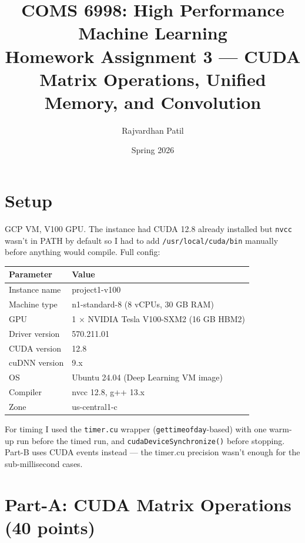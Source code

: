 \documentclass[11pt,letterpaper]{article}
\title{\textbf{COMS 6998: High Performance Machine Learning}\\
       Homework Assignment 3 --- CUDA Matrix Operations, Unified Memory, and Convolution}
\author{Rajvardhan Patil}
\date{Spring 2026}
\begin{document}
\maketitle
\tableofcontents
\newpage

\section{Setup}

GCP VM, V100 GPU. The instance had CUDA 12.8 already installed but \texttt{nvcc}
wasn't in PATH by default so I had to add \texttt{/usr/local/cuda/bin} manually
before anything would compile. Full config:

\begin{center}
\begin{tabular}{ll}
\toprule
\textbf{Parameter} & \textbf{Value} \\
\midrule
Instance name   & project1-v100 \\
Machine type    & n1-standard-8 (8 vCPUs, 30 GB RAM) \\
GPU             & 1 $\times$ NVIDIA Tesla V100-SXM2 (16 GB HBM2) \\
Driver version  & 570.211.01 \\
CUDA version    & 12.8 \\
cuDNN version   & 9.x \\
OS              & Ubuntu 24.04 (Deep Learning VM image) \\
Compiler        & nvcc 12.8, g++ 13.x \\
Zone            & us-central1-c \\
\bottomrule
\end{tabular}
\end{center}

For timing I used the \texttt{timer.cu} wrapper (\texttt{gettimeofday}-based) with
one warm-up run before the timed run, and \texttt{cudaDeviceSynchronize()} before
stopping. Part-B uses CUDA events instead --- the timer.cu precision wasn't enough
for the sub-millisecond cases.

\section{Part-A: CUDA Matrix Operations (40 points)}
\end{document}
